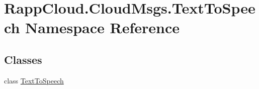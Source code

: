 \hypertarget{namespaceRappCloud_1_1CloudMsgs_1_1TextToSpeech}{\section{Rapp\-Cloud.\-Cloud\-Msgs.\-Text\-To\-Speech Namespace Reference}
\label{namespaceRappCloud_1_1CloudMsgs_1_1TextToSpeech}
}
\subsection*{Classes}
\begin{DoxyCompactItemize}
\item 
class \hyperlink{classRappCloud_1_1CloudMsgs_1_1TextToSpeech_1_1TextToSpeech}{Text\-To\-Speech}
\end{DoxyCompactItemize}

